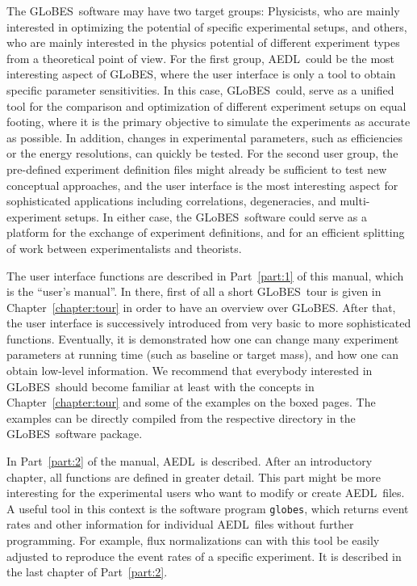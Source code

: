 \documentclass[a4paper,12pt,twoside]{book}
\newcommand{\Chapt}{Chapter}
\newcommand{\Part}{Part}
\newcommand{\GLOBES}{{\sf GLoBES}}
\newcommand{\AEDL}{{\sf AEDL}}
\begin{document}
The \GLOBES\ software may have two target groups: 
Physicists, who are mainly interested in optimizing the potential
of specific experimental setups, and others, who are mainly
interested in the physics potential of different experiment types
from a theoretical point of view.
For the first group, \AEDL\ could be the most interesting aspect of
\GLOBES , where the user interface is only a tool to obtain specific
parameter sensitivities. In this case, \GLOBES\ could, serve as a
unified tool for the comparison and optimization of different experiment
 setups on equal footing, where
it is the primary objective to simulate the experiments as accurate
as possible. In addition, changes in experimental parameters, such as
efficiencies or the energy resolutions, can quickly be tested.
%
For the second user group, the pre-defined 
experiment definition files might already be sufficient to test
new conceptual approaches, and the user interface is the most interesting
aspect for sophisticated applications including correlations,
degeneracies, and multi-experiment setups. In either case, the \GLOBES\
software could serve as a platform for the exchange of experiment
definitions, and for an efficient splitting of work between
experimentalists and theorists.

The user interface functions are described in \Part~\ref{part:1} of 
this manual, which is the ``user's manual''. In there, first of all a 
short \GLOBES\ tour is given in \Chapt~\ref{chapter:tour} in order to 
have an overview over \GLOBES .
After that, the user
interface is successively introduced from very basic to more sophisticated
functions. Eventually, it is demonstrated how one can change many
experiment parameters at running time (such as baseline or target mass), and how one can obtain low-level
information. We recommend that everybody interested in \GLOBES\ should
become familiar at least with the concepts in \Chapt~\ref{chapter:tour}
 and some of the examples on the boxed pages. The examples can be 
 directly compiled 
 from the respective directory in the \GLOBES\ software package.

In \Part~\ref{part:2} of the manual, \AEDL\ is described. After an
introductory chapter, all functions are defined in greater detail.
This part might be more interesting for the experimental users who
want to modify or create \AEDL\ files. A useful tool in this context
is the software program \verb+globes+, which returns event rates and other
information for individual \AEDL\ files without further programming. 
For example, flux normalizations can with this tool be easily adjusted 
to reproduce the event rates of a specific experiment. It is described
in the last chapter of \Part~\ref{part:2}.
\end{document}
